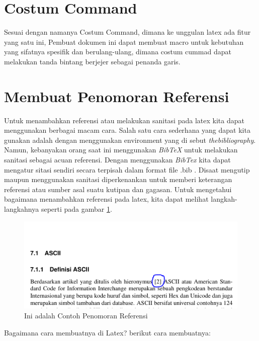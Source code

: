 \section{Costum Command}
Sesuai  dengan  namanya Costum Command, dimana ke unggulan latex ada fitur yang satu ini, Pembuat dokumen ini dapat  membuat macro untuk kebutuhan yang sifatnya spesifik dan berulang-ulang, dimana costum cummad dapat melakukan tanda bintang berjejer sebagai penanda garis.

\section{Membuat Penomoran Referensi}
Untuk menambahkan referensi atau melakukan sanitasi pada latex kita dapat menggunakan berbagai macam cara. Salah satu cara sederhana yang dapat kita gunakan adalah dengan menggunakan environment yang di sebut \textit{thebibliography}. Namun, kebanyakan orang saat ini menggunakan \textit{BibTeX} untuk melakukan sanitasi sebagai acuan referensi. Dengan menggunakan \textit{BibTex} kita dapat mengatur sitasi sendiri secara terpisah dalam format file \*.bib \cite{atmaja2015tutorial}. Disaat mengutip maupun menggunakan sanitasi diperkenankan untuk memberi keterangan referensi atau sumber asal suatu kutipan dan gagasan. Untuk mengetahui bagaimana menambahkan referensi pada latex, kita dapat melihat langkah-langkahnya seperti pada gambar \ref{fig:contohpenomoranref}.
\begin{figure}[!htbp]
  \centering
  \includegraphics[width=.75\textwidth]{figures/contohpenomoranref.png}
  \caption{Ini adalah Contoh Penomoran Referensi}\label{fig:contohpenomoranref}
\end{figure}
\par Bagaimana cara membuatnya di Latex? berikut cara membuatnya:
